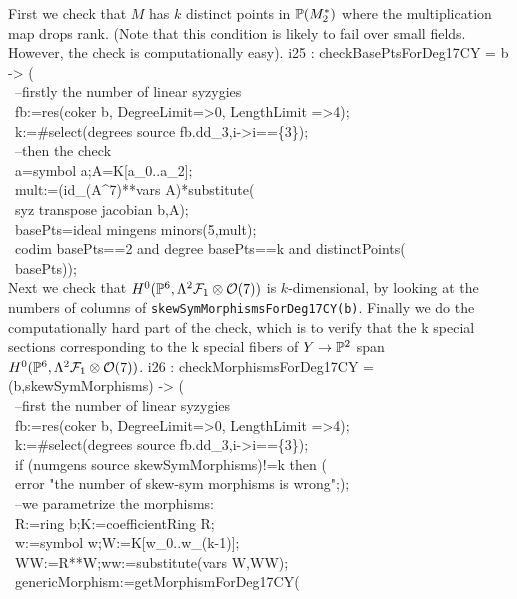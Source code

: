 First we check that $M$ has $k$ distinct points in ${\mathbb P}(M_2^*)$ where 
the multiplication map drops rank. 
(Note that this condition is likely to fail over small fields. 
However, the check is computationally easy).
\beginOutput
i25 : checkBasePtsForDeg17CY = b -> (\\
\           --firstly the number of linear syzygies\\
\           fb:=res(coker b, DegreeLimit=>0, LengthLimit =>4);\\
\           k:=#select(degrees source fb.dd_3,i->i==\{3\});\\
\           --then the check\\
\           a=symbol a;A=K[a_0..a_2];\\
\           mult:=(id_(A^7)**vars A)*substitute(\\
\                syz transpose jacobian b,A);\\
\           basePts=ideal mingens minors(5,mult);\\
\           codim basePts==2 and degree basePts==k and distinctPoints(\\
\                basePts));\\
\endOutput
Next we check that $H^0({\mathbb P}^6,\Lambda^2 {\mathcal F}_1 \otimes {\mathcal O}(7))$ is $k$-dimensional,
by looking at the numbers of columns of {\tt skewSymMorphismsForDeg17CY(b)}.
Finally we do the computationally hard part of the check, which is to
verify that the k special sections corresponding to the k special
fibers of $Y \to {\mathbb P}^2$ span $H^0({\mathbb P}^6,\Lambda^2 {\mathcal F}_1 \otimes {\mathcal O}(7))$.
\beginOutput
i26 : checkMorphismsForDeg17CY = (b,skewSymMorphisms) -> (\\
\           --first the number of linear syzygies\\
\           fb:=res(coker b, DegreeLimit=>0, LengthLimit =>4);\\
\           k:=#select(degrees source fb.dd_3,i->i==\{3\});\\
\           if (numgens source skewSymMorphisms)!=k then (\\
\                error "the number of skew-sym morphisms is wrong";);\\
\           --we parametrize the morphisms:\\
\           R:=ring b;K:=coefficientRing R;\\
\           w:=symbol w;W:=K[w_0..w_(k-1)];\\
\           WW:=R**W;ww:=substitute(vars W,WW);\\
\           genericMorphism:=getMorphismForDeg17CY(\\
